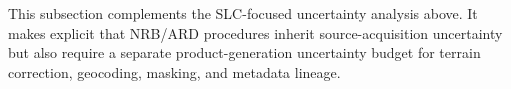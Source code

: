 This subsection complements the \ac{SLC}-focused uncertainty analysis above. It makes explicit that \ac{NRB}/\ac{ARD} procedures inherit source-acquisition uncertainty but also require a separate product-generation uncertainty budget for terrain correction, geocoding, masking, and metadata lineage.



